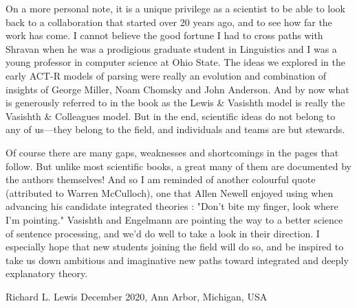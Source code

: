 On a more personal note, it is a unique privilege as a scientist to be
able to look back to a collaboration that started over 20 years ago, and
to see how far the work has come. I cannot believe the good fortune I
had to cross paths with Shravan when he was a prodigious graduate
student in Linguistics and I was a young professor in computer science
at Ohio State. The ideas we explored in the early ACT-R models of
parsing were really an evolution and combination of insights of George
Miller, Noam Chomsky and John Anderson. And by now what is generously
referred to in the book as the Lewis \& Vasishth model is really the
Vasishth \& Colleagues model. But in the end, scientific ideas do not
belong to any of us---they belong to the field, and individuals and
teams are but stewards.

Of course there are many gaps, weaknesses and shortcomings in the pages
that follow. But unlike most scientific books, a great many of them are
documented by the authors themselves! And so I am reminded of another
colourful quote (attributed to Warren McCulloch), one that Allen Newell
enjoyed using when advancing his candidate integrated theories : "Don't
bite my finger, look where I'm pointing."  Vasishth and Engelmann are
pointing the way to a better science of sentence processing, and we'd do
well to take a look in their direction. I especially hope that new
students joining the field will do so, and be inspired to take us down
ambitious and imaginative new paths toward integrated and deeply
explanatory theory.

\noindent
\hfill Richard L. Lewis  December 2020, Ann Arbor, Michigan, USA
